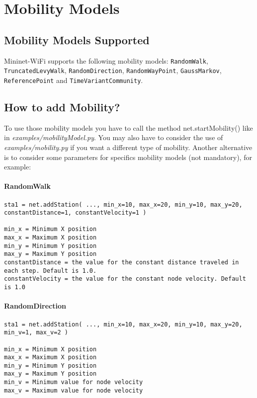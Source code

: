 \chapter{Mobility Models}

\section{Mobility Models Supported}
Mininet-WiFi supports the following mobility models: \texttt{RandomWalk}, \texttt{TruncatedLevyWalk}, \texttt{RandomDirection}, \texttt{RandomWayPoint}, \texttt{GaussMarkov}, \texttt{ReferencePoint} and \texttt{TimeVariantCommunity}.

\section{How to add Mobility?}
To use those mobility models you have to call the method net.startMobility() like in \textit{examples/mobilityModel.py}. You may also have to consider the use of \textit{examples/mobility.py} if you want a different type of mobility. Another alternative is to consider some parameters for specifics mobility models (not mandatory), for example:

\subsubsection{RandomWalk}

\begin{verbatim}
sta1 = net.addStation( ..., min_x=10, max_x=20, min_y=10, max_y=20, constantDistance=1, constantVelocity=1 )

min_x = Minimum X position
max_x = Maximum X position
min_y = Minimum Y position
max_y = Maximum Y position
constantDistance = the value for the constant distance traveled in each step. Default is 1.0.
constantVelocity = the value for the constant node velocity. Default is 1.0
\end{verbatim}

\subsubsection{RandomDirection}

\begin{verbatim}
sta1 = net.addStation( ..., min_x=10, max_x=20, min_y=10, max_y=20, min_v=1, max_v=2 )

min_x = Minimum X position
max_x = Maximum X position
min_y = Minimum Y position
max_y = Maximum Y position
min_v = Minimum value for node velocity
max_v = Maximum value for node velocity
\end{verbatim}

